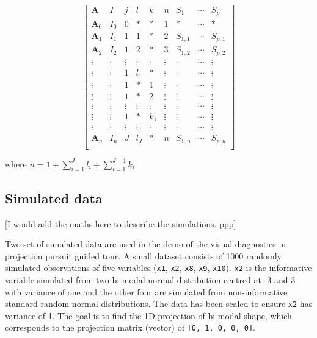 \documentclass[12pt]{article}
\begin{document}
\begin{equation}
\left[
\begin{array}{c|c|cccc|ccc}
\mathbf{A} & I & j &  l  & k & n & S_{1}& \cdots & S_{p}\\
\hline
\mathbf{A}_0 & I_0 & 0 & \ast & \ast & 1 & \ast & \cdots & \ast\\
\hline
\mathbf{A}_1 & I_1 & 1 & 1 & \ast& 2 & S_{1, 1} & \cdots & S_{p, 1}\\
\mathbf{A}_2 & I_2 & 1 & 2 &\ast & 3 & S_{1, 2} & \cdots & S_{p, 2}\\
\vdots &\vdots & \vdots &\vdots & \vdots &\vdots &\vdots &\cdots &\vdots\\
\vdots & \vdots & 1 & l_1 & \ast & \vdots & \vdots & \cdots & \vdots\\
\hline
\vdots & \vdots & 1 & \ast & 1& \vdots &\vdots & \cdots & \vdots\\
\vdots &\vdots& 1 & \ast & 2& \vdots&\vdots & \cdots & \vdots\\
\vdots &\vdots &\vdots  &\vdots & \vdots &\vdots &\vdots &\cdots &\vdots \\
\vdots &\vdots & 1 & \ast & k_1&\vdots &\vdots & \cdots & \vdots\\
\hline
\vdots &\vdots &\vdots  &\vdots & \vdots &\vdots &\vdots &\cdots &\vdots \\
\mathbf{A}_n & I_n & J &  l_J & \ast & n & S_{1, n}& \cdots & S_{p, n}\\
\end{array}
\right]
\label{eq:data-structure}
\end{equation}

where \(n = 1+ \sum_{i = 1}^J l_i + \sum_{i = 1}^{J-1} k_i\)

\hypertarget{simulated-data}{%
\subsection{Simulated data}\label{simulated-data}}

{[}I would add the maths here to describe the simulations. ppp{]}

Two set of simulated data are used in the demo of the visual diagnostics
in projection pursuit guided tour. A small dataset consists of 1000
randomly simulated observations of five variables (\texttt{x1},
\texttt{x2}, \texttt{x8}, \texttt{x9}, \texttt{x10}). \texttt{x2} is the
informative variable simulated from two bi-modal normal distribution
centred at -3 and 3 with variance of one and the other four are
simulated from non-informative standard random normal distributions. The
data has been scaled to ensure \texttt{x2} has variance of 1. The goal
is to find the 1D projection of bi-modal shape, which corresponds to the
projection matrix (vector) of \texttt{{[}0,\ 1,\ 0,\ 0,\ 0{]}}.
\end{document}
